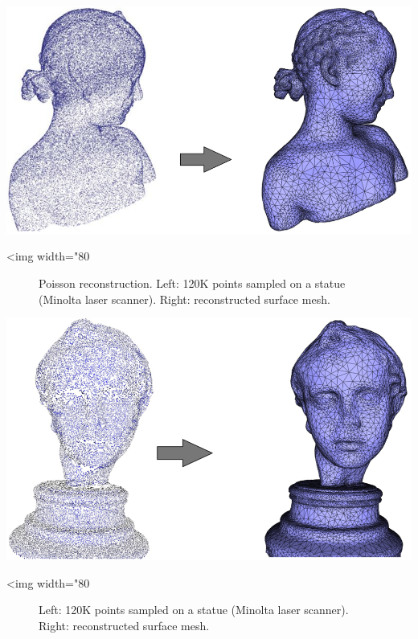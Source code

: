 \begin{center}
    \label{Surface_reconstruction_points_3-fig-bimba}
    \begin{ccTexOnly}
  \includegraphics[width=1.0\textwidth]{Surface_reconstruction_points_3/bimba}
    \end{ccTexOnly}
    \begin{ccHtmlOnly}
        <img width="80%
    \end{ccHtmlOnly}
    \begin{figure}[h]
        \caption{Poisson reconstruction.
                 Left: 120K points sampled on a statue (Minolta laser scanner).
                 Right: reconstructed surface mesh.}
    \end{figure}
\end{center}

\begin{center}
    \label{Surface_reconstruction_points_3-fig-eros}
    \begin{ccTexOnly}
\includegraphics[width=1.0\textwidth]{Surface_reconstruction_points_3/eros}
    \end{ccTexOnly}
    \begin{ccHtmlOnly}
        <img width="80%
    \end{ccHtmlOnly}
    \begin{figure}[h]
        \caption{Left: 120K points sampled on a statue (Minolta laser scanner).
                 Right: reconstructed surface mesh.}
    \end{figure}
\end{center}


